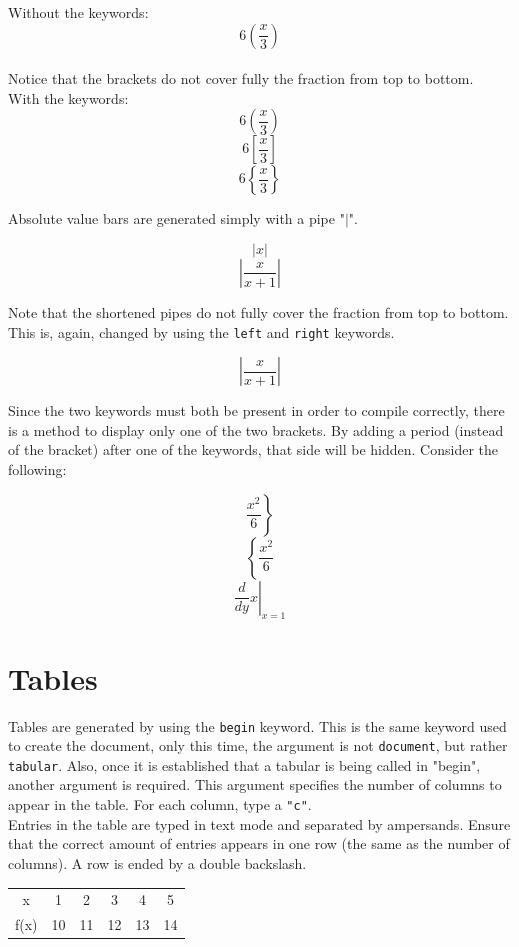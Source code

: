 \documentclass[11pt]{article}
\begin{document}
Without the keywords: $$6(\frac{x}{3})$$ \\

Notice that the brackets do not cover fully the fraction from top to bottom.\\

With the keywords: $$6\left(\frac{x}{3}\right)$$
$$6\left[\frac{x}{3}\right]$$
$$6\left\{\frac{x}{3}\right\}$$

Absolute value bars are generated simply with a pipe "$|$".

$$|x|$$
$$|\frac{x}{x+1}|$$

Note that the shortened pipes do not fully cover the fraction from top to bottom. This is, again, changed by using the \texttt{left} and \texttt{right} keywords.

$$\left|\frac{x}{x+1}\right|$$

Since the two keywords must both be present in order to compile correctly, there is a method to display only one of the two brackets. By adding a period (instead of the bracket) after one of the keywords, that side will be hidden. Consider the following:

$$\left.\frac{x^2}{6}\right\}$$
$$\left\{\frac{x^2}{6}\right.$$
$$\left.\frac{d}{dy} x\right|_{x=1}$$

\section{Tables}

Tables are generated by using the \texttt{begin} keyword. This is the same keyword used to create the document, only this time, the argument is not \texttt{document}, but rather \texttt{tabular}. Also, once it is established that a tabular is being called in "begin", another argument is required. This argument specifies the number of columns to appear in the table. For each column, type a \texttt{"c"}. \\

Entries in the table are typed in text mode and separated by ampersands. Ensure that the correct amount of entries appears in one row (the same as the number of columns). A row is ended by a double backslash. \\

\begin{tabular}{cccccc}
x & 1 & 2 & 3 & 4 & 5 \\
f(x) & 10 & 11 & 12 & 13 & 14 \\
\end{tabular} \\
\end{document}
